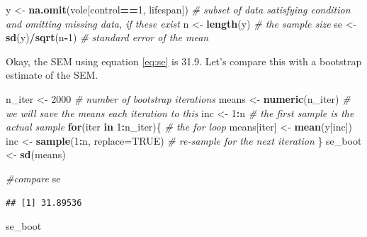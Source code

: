 \documentclass[]{book}
\newenvironment{Shaded}{\begin{snugshade}}{\end{snugshade}}
\newcommand{\KeywordTok}[1]{\textcolor[rgb]{0.13,0.29,0.53}{\textbf{#1}}}
\newcommand{\DataTypeTok}[1]{\textcolor[rgb]{0.13,0.29,0.53}{#1}}
\newcommand{\DecValTok}[1]{\textcolor[rgb]{0.00,0.00,0.81}{#1}}
\newcommand{\StringTok}[1]{\textcolor[rgb]{0.31,0.60,0.02}{#1}}
\newcommand{\CommentTok}[1]{\textcolor[rgb]{0.56,0.35,0.01}{\textit{#1}}}
\newcommand{\OtherTok}[1]{\textcolor[rgb]{0.56,0.35,0.01}{#1}}
\newcommand{\ControlFlowTok}[1]{\textcolor[rgb]{0.13,0.29,0.53}{\textbf{#1}}}
\newcommand{\OperatorTok}[1]{\textcolor[rgb]{0.81,0.36,0.00}{\textbf{#1}}}
\newcommand{\NormalTok}[1]{#1}
\theoremstyle{definition}
\theoremstyle{definition}
\theoremstyle{definition}
\theoremstyle{remark}
\begin{document}
\begin{Shaded}
\begin{Highlighting}[]
\NormalTok{y <-}\StringTok{ }\KeywordTok{na.omit}\NormalTok{(vole[control}\OperatorTok{==}\DecValTok{1}\NormalTok{, lifespan]) }\CommentTok{# subset of data satisfying condition and omitting missing data, if these exist}
\NormalTok{n <-}\StringTok{ }\KeywordTok{length}\NormalTok{(y) }\CommentTok{# the sample size}
\NormalTok{se <-}\StringTok{ }\KeywordTok{sd}\NormalTok{(y)}\OperatorTok{/}\KeywordTok{sqrt}\NormalTok{(n}\OperatorTok{-}\DecValTok{1}\NormalTok{) }\CommentTok{# standard error of the mean}
\end{Highlighting}
\end{Shaded}

Okay, the SEM using equation \eqref{eq:se} is 31.9. Let's compare this
with a bootstrap estimate of the SEM.

\begin{Shaded}
\begin{Highlighting}[]
\NormalTok{n_iter <-}\StringTok{ }\DecValTok{2000} \CommentTok{# number of bootstrap iterations}
\NormalTok{means <-}\StringTok{ }\KeywordTok{numeric}\NormalTok{(n_iter) }\CommentTok{# we will save the means each iteration to this}
\NormalTok{inc <-}\StringTok{ }\DecValTok{1}\OperatorTok{:}\NormalTok{n }\CommentTok{# the first sample is the actual sample}
\ControlFlowTok{for}\NormalTok{(iter }\ControlFlowTok{in} \DecValTok{1}\OperatorTok{:}\NormalTok{n_iter)\{ }\CommentTok{# the for loop}
\NormalTok{  means[iter] <-}\StringTok{ }\KeywordTok{mean}\NormalTok{(y[inc])}
\NormalTok{  inc <-}\StringTok{ }\KeywordTok{sample}\NormalTok{(}\DecValTok{1}\OperatorTok{:}\NormalTok{n, }\DataTypeTok{replace=}\OtherTok{TRUE}\NormalTok{) }\CommentTok{# re-sample for the next iteration}
\NormalTok{\}}
\NormalTok{se_boot <-}\StringTok{ }\KeywordTok{sd}\NormalTok{(means)}

\CommentTok{#compare}
\NormalTok{se}
\end{Highlighting}
\end{Shaded}

\begin{verbatim}
## [1] 31.89536
\end{verbatim}

\begin{Shaded}
\begin{Highlighting}[]
\NormalTok{se_boot}
\end{Highlighting}
\end{Shaded}
\end{document}
